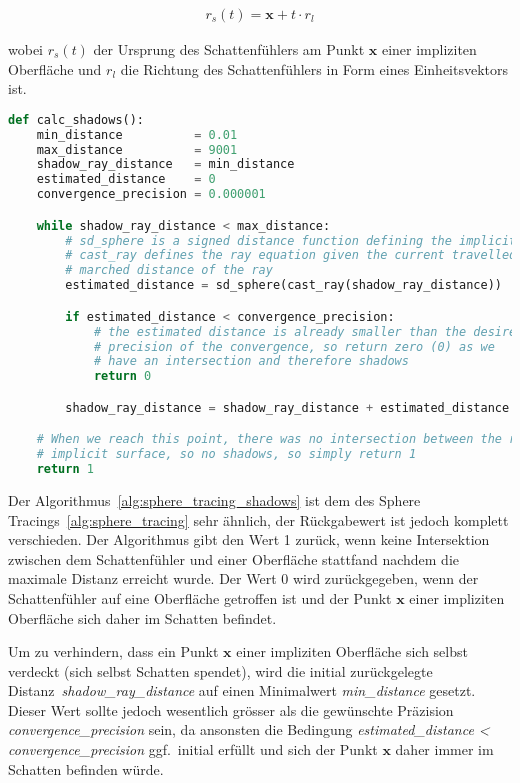 \begin{gather}
    r_{s}(t) = \bm{x} + t \cdot r_{l}
\end{gather}

wobei $r_{s}(t)$ der Ursprung des Schattenfühlers am Punkt $\bm{x}$
einer impliziten Oberfläche und $r_{l}$ die Richtung des
Schattenfühlers in Form eines Einheitsvektors ist.

\begin{lstlisting}[language=Python,caption={Algorithmus zur Berechnung
        von Schatten.},label={alg:sphere_tracing_shadows},captionpos=b,emph={calc_shadows}]
def calc_shadows():
    min_distance          = 0.01
    max_distance          = 9001
    shadow_ray_distance   = min_distance
    estimated_distance    = 0
    convergence_precision = 0.000001

    while shadow_ray_distance < max_distance:
        # sd_sphere is a signed distance function defining the implicit surface
        # cast_ray defines the ray equation given the current travelled /
        # marched distance of the ray
        estimated_distance = sd_sphere(cast_ray(shadow_ray_distance))

        if estimated_distance < convergence_precision:
            # the estimated distance is already smaller than the desired
            # precision of the convergence, so return zero (0) as we
            # have an intersection and therefore shadows
            return 0

        shadow_ray_distance = shadow_ray_distance + estimated_distance

    # When we reach this point, there was no intersection between the ray and a
    # implicit surface, so no shadows, so simply return 1
    return 1
\end{lstlisting}

Der Algorithmus~\ref{alg:sphere_tracing_shadows} ist dem des Sphere
Tracings~\ref{alg:sphere_tracing} sehr ähnlich, der Rückgabewert ist
jedoch komplett verschieden. Der Algorithmus gibt den Wert 1 zurück,
wenn keine Intersektion zwischen dem  Schattenfühler und einer
Oberfläche stattfand nachdem die maximale Distanz erreicht wurde. Der
Wert 0 wird zurückgegeben, wenn der Schattenfühler auf eine Oberfläche
getroffen ist und der Punkt $\bm{x}$ einer impliziten Oberfläche sich
daher im Schatten befindet.

Um zu verhindern, dass ein Punkt $\bm{x}$ einer impliziten Oberfläche
sich selbst verdeckt (sich selbst Schatten spendet), wird die initial
zurückgelegte Distanz~\textit{shadow\_ray\_distance} auf einen Minimalwert
\textit{min\_distance} gesetzt. Dieser Wert sollte jedoch wesentlich
grösser als die gewünschte Präzision \textit{convergence\_precision}
sein, da ansonsten die Bedingung \textit{estimated\_distance <
    convergence\_precision} ggf.\ initial erfüllt und sich der Punkt $\bm{x}$
daher immer im Schatten befinden würde.

